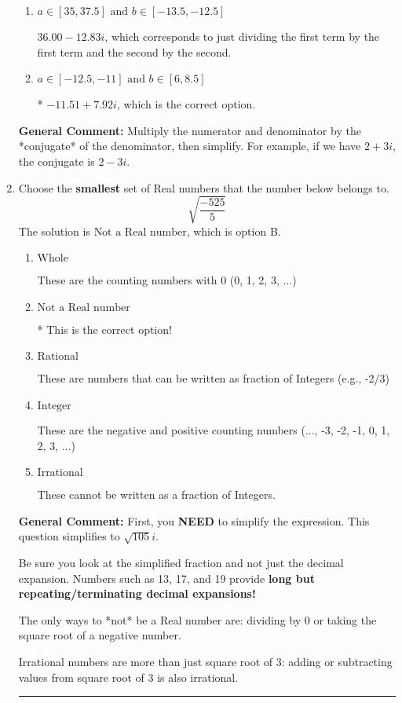 \documentclass{extbook}[14pt]
\newcommand{\litem}[1]{\item #1

\rule{\textwidth}{0.4pt}}
\begin{document}
\begin{enumerate}
{\begin{enumerate}[label=\Alph*.]
 $-11.51  + 293.00 i$, which corresponds to forgetting to multiply the conjugate by the numerator.
\item \( a \in [35, 37.5] \text{ and } b \in [-13.5, -12.5] \)

 $36.00  - 12.83 i$, which corresponds to just dividing the first term by the first term and the second by the second.
\item \( a \in [-12.5, -11] \text{ and } b \in [6, 8.5] \)

* $-11.51  + 7.92 i$, which is the correct option.
\end{enumerate}

\textbf{General Comment:} Multiply the numerator and denominator by the *conjugate* of the denominator, then simplify. For example, if we have $2+3i$, the conjugate is $2-3i$.
}
\litem{
Choose the \textbf{smallest} set of Real numbers that the number below belongs to.
\[ \sqrt{\frac{-525}{5}} \]The solution is \( \text{Not a Real number} \), which is option B.\begin{enumerate}[label=\Alph*.]
\item \( \text{Whole} \)

These are the counting numbers with 0 (0, 1, 2, 3, ...)
\item \( \text{Not a Real number} \)

* This is the correct option!
\item \( \text{Rational} \)

These are numbers that can be written as fraction of Integers (e.g., -2/3)
\item \( \text{Integer} \)

These are the negative and positive counting numbers (..., -3, -2, -1, 0, 1, 2, 3, ...)
\item \( \text{Irrational} \)

These cannot be written as a fraction of Integers.
\end{enumerate}

\textbf{General Comment:} First, you \textbf{NEED} to simplify the expression. This question simplifies to $\sqrt{105} i$. 
 
 Be sure you look at the simplified fraction and not just the decimal expansion. Numbers such as 13, 17, and 19 provide \textbf{long but repeating/terminating decimal expansions!} 
 
 The only ways to *not* be a Real number are: dividing by 0 or taking the square root of a negative number. 
 
 Irrational numbers are more than just square root of 3: adding or subtracting values from square root of 3 is also irrational.
}
\end{enumerate}
\end{document}
